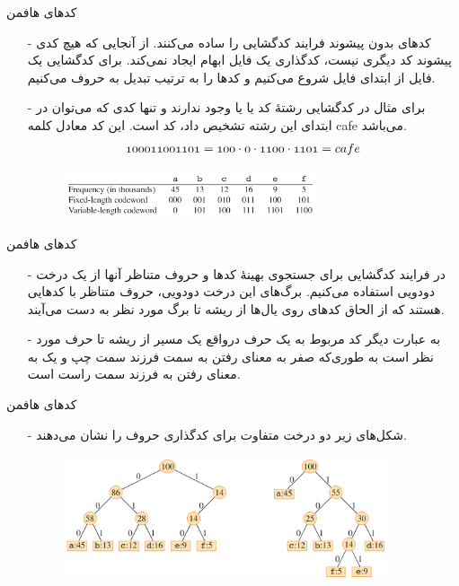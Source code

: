 \begin{frame}{‌کدهای هافمن}
\begin{itemize}\itemr
\item[-]
کدهای بدون پیشوند فرایند کدگشایی را ساده می‌کنند. از آنجایی که هیچ کدی پیشوند کد دیگری نیست، کدگذاری یک فایل ابهام ایجاد نمی‌کند. برای کدگشایی یک فایل از ابتدای فایل شروع می‌کنیم و کدها را به ترتیب تبدیل به حروف می‌کنیم.
\item[-]
برای مثال در کدگشایی رشتهٔ
کد
یا
یا
وجود ندارند و تنها کدی که می‌توان در ابتدای این رشته تشخیص داد، کد
است. این کد معادل کلمه
cafe
می‌باشد.
\begin{align*}
\mathnormal{100011001101 = 100 \cdot 0 \cdot 1100 \cdot 1101 = cafe}
\end{align*}
\begin{figure}
\includegraphics[width=0.7\textwidth]{figs/chap05/huffman-vlc}
\end{figure}
\end{itemize}
\end{frame}


\begin{frame}{‌کدهای هافمن}
\begin{itemize}\itemr
\item[-]
در فرایند کدگشایی برای جستجوی بهینهٔ کدها و حروف متناظر آنها از یک درخت دودویی استفاده می‌کنیم. برگ‌های این درخت دودویی، حروف متناظر با کدهایی هستند که از الحاق کدهای روی یال‌ها از ریشه تا برگ مورد نظر به دست می‌آیند.
\item[-]
به عبارت دیگر کد مربوط به یک حرف درواقع یک مسیر از ریشه تا حرف مورد نظر است به طوری‌که صفر به معنای رفتن به سمت فرزند سمت چپ و یک به معنای رفتن به فرزند سمت راست است.
\end{itemize}
\end{frame}


\begin{frame}{‌کدهای هافمن}
\begin{itemize}\itemr
\item[-]
شکل‌های زیر دو درخت متفاوت برای کدگذاری حروف را نشان می‌دهند.
\begin{figure}
\includegraphics[width=0.9\textwidth]{figs/chap05/huffman-tree}
\end{figure}
\end{itemize}
\end{frame}


